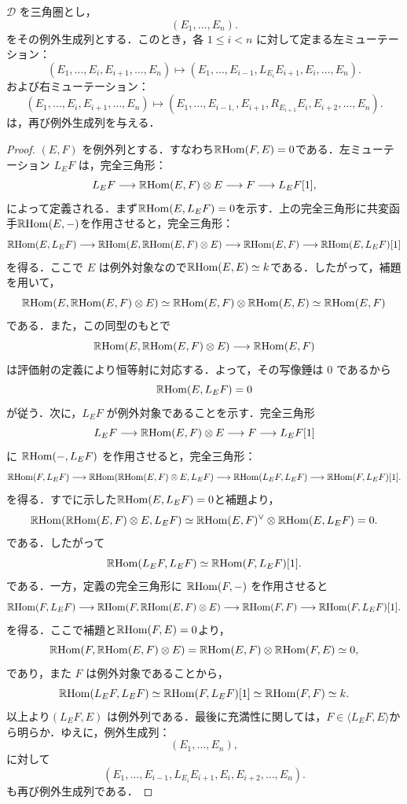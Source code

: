 \begin{thm}
$\mathcal D$ を三角圏とし，
\[
(E_1,\dots,E_n).
\]
をその例外生成列とする．このとき，各 $1\le i<n$ に対して定まる左ミューテーション：
\[
(E_1,\dots,E_i,E_{i+1},\dots,E_n)
\longmapsto
(E_1,\dots,E_{i-1},L_{E_{i}}E_{i+1},E_i,\dots,E_n).
\]
および右ミューテーション：
\[
(E_1,\dots,E_i,E_{i+1},\dots,E_n)
\longmapsto
(E_1,\dots,E_{i-1,},E_{i+1},R_{E_{i+1}}E_{i},E_{i+2},\dots,E_n).
\]
は，再び例外生成列を与える．
\end{thm}

\begin{proof}
$(E,F)$ を例外列とする．すなわち$\RHom(F,E)=0$である．左ミューテーション $L_EF$ は，完全三角形：
\[L_EF\longrightarrow\RHom(E,F)\otimes E\longrightarrow F\longrightarrow L_EF[1],
\]
によって定義される．まず$\RHom(E,L_EF)=0$を示す．上の完全三角形に共変函手$\RHom(E,-)$を作用させると，完全三角形：
\[
\RHom(E,L_EF)
\longrightarrow
\RHom(E,\RHom(E,F)\otimes E)
\longrightarrow
\RHom(E,F)
\longrightarrow
\RHom(E,L_EF)[1]
\]
を得る．ここで $E$ は例外対象なので$\RHom(E,E)\simeq k$である．したがって，補題を用いて，
\[
\RHom(E,\RHom(E,F)\otimes E)
\simeq
\RHom(E,F)\otimes \RHom(E,E)
\simeq
\RHom(E,F)
\]
である．また，この同型のもとで
\[
\RHom(E,\RHom(E,F)\otimes E)
\longrightarrow
\RHom(E,F)
\]
は評価射の定義により恒等射に対応する．よって，その写像錘は $0$ であるから
\[
\RHom(E,L_EF)=0
\]
が従う．次に，$L_EF$ が例外対象であることを示す．完全三角形
\[
L_EF
\longrightarrow
\RHom(E,F)\otimes E
\longrightarrow
F
\longrightarrow
L_EF[1]
\]
に $\RHom(-,L_EF)$ を作用させると，完全三角形：
\[
\RHom(F,L_EF)
\longrightarrow
\RHom(\RHom(E,F)\otimes E,L_EF)
\longrightarrow
\RHom(L_EF,L_EF)
\longrightarrow
\RHom(F,L_EF)[1].
\]
を得る．すでに示した$\RHom(E,L_EF)=0$と補題より，
\[
\RHom(\RHom(E,F)\otimes E,L_EF)\simeq\RHom(E,F)^\vee\otimes\RHom(E,L_EF)=0.
\]
である．したがって
\[
\RHom(L_EF,L_EF)
\simeq
\RHom(F,L_EF)[1].
\]
である．一方，定義の完全三角形に $\RHom(F,-)$ を作用させると
\[
\RHom(F,L_EF)
\longrightarrow
\RHom(F,\RHom(E,F)\otimes E)
\longrightarrow
\RHom(F,F)
\longrightarrow
\RHom(F,L_EF)[1].
\]
を得る．ここで補題と$\RHom(F,E)=0$より，
\[
\RHom(F,\RHom(E,F)\otimes E)=\RHom(E,F)\otimes\RHom(F,E)\simeq0,
\]
であり，また $F$ は例外対象であることから，
\[
	\RHom(L_EF,L_EF) \simeq\RHom(F,L_E F)[1]\simeq\RHom(F,F)\simeq k.
\]
以上より$(L_EF,E)$ は例外列である．最後に充満性に関しては，$F\in \langle L_EF,E\rangle $から明らか．ゆえに，例外生成列：
\[
(E_1,\dots,E_n),
\]
に対して
\[
(E_1,\dots,E_{i-1},
L_{E_i}E_{i+1},
E_i,
E_{i+2},\dots,E_n).
\]
も再び例外生成列である．
\end{proof}

